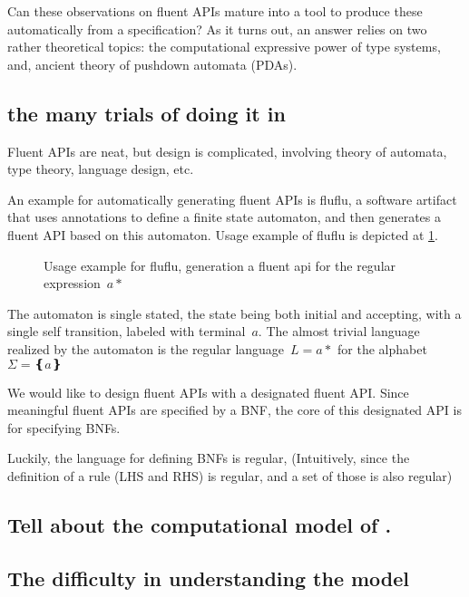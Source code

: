 Can these observations on fluent APIs mature into
  a tool to produce these automatically from a specification?
As it turns out, an answer relies on
  two rather theoretical topics:
  the computational expressive power of type systems,
  and, ancient theory of pushdown automata (PDAs).

\subsection{the many trials of doing it in \Java}
Fluent APIs are neat, but design is complicated,
involving theory of automata, type theory, language design, etc.

An example for automatically generating fluent APIs is
fluflu, a software artifact that uses
\Java annotations to define a finite state automaton, and then generates a
fluent API based on this automaton.  Usage example of fluflu is depicted at
\cref{figure:fluflu}. 

\begin{figure}
  \caption{\label{figure:fluflu}
    Usage example for fluflu, generation a fluent
    api for the regular expression~$a*$}
\end{figure}
  
The automaton is single stated, the state
being both initial and accepting, with a single self transition, labeled with 
terminal~$a$.  The almost trivial language realized by the automaton is
the regular language~$L=a*$ for the alphabet~$Σ=❴a❵$


We would like to design fluent APIs with a designated fluent API\@.
Since meaningful fluent APIs are specified by a BNF, the core of
  this designated API is for specifying BNFs\@.

Luckily, the language for defining BNFs is regular,
(Intuitively, since the definition of a rule (LHS and RHS) is regular,
and a set of those is also regular)

\subsection{Tell about the computational model of \CC.}

\subsection{The difficulty in understanding the \Java model}

